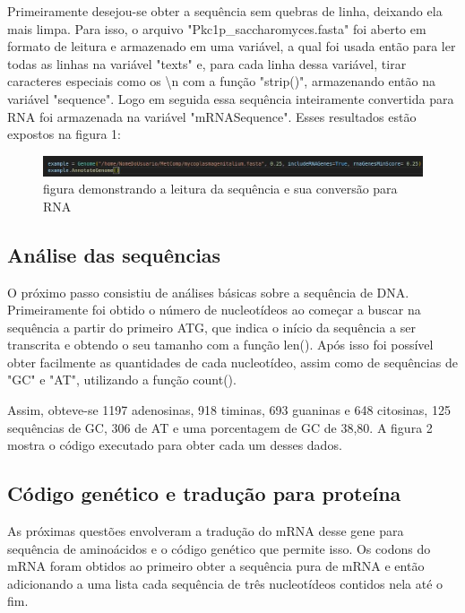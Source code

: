 \documentclass[brazilian,12pt,a4paper,final]{article}
\begin{document}
	
	
	
	
	
	
	
	
	  
	
	\indent 
	Primeiramente desejou-se obter a sequência sem quebras de linha, deixando ela mais limpa.
	Para isso, o arquivo "Pkc1p\_saccharomyces.fasta" foi aberto em formato de leitura e armazenado
	em uma variável, a qual foi usada então para ler todas as linhas na variável "texts" e, para cada
	linha dessa variável, tirar caracteres especiais como os \textbackslash{}n com a função "strip()", armazenando 
	então na variável "sequence". Logo em seguida essa sequência inteiramente convertida para RNA foi
	armazenada na variável "mRNASequence". Esses resultados estão expostos na figura 1:
	\vspace{0.5cm}
	
	\begin{figure}[hbtp]
		\begin{center}
			\includegraphics[]{Instanciacao.jpg}
			\caption{figura demonstrando a leitura da sequência e sua conversão para RNA}
			\label{fig}
		\end{center}
	\end{figure}
	
	\subsection{Análise das sequências}
	O próximo passo consistiu de análises básicas sobre a sequência de DNA. Primeiramente foi obtido o número de nucleotídeos ao começar a buscar na sequência a partir do primeiro ATG, que indica o início da sequência a ser transcrita e obtendo o seu tamanho com a função
	len(). Após isso foi possível obter facilmente as quantidades de cada nucleotídeo, assim como de sequências de "GC" e "AT", utilizando a função count().
	
	Assim, obteve-se 1197 adenosinas, 918 timinas, 693 guaninas e 648 citosinas, 125 sequências de GC, 306 de AT e uma porcentagem de GC de 38,80. A figura 2 mostra o código executado para obter cada um desses dados.
	
	
	\subsection{Código genético e tradução para proteína}
	As próximas questões envolveram a tradução do mRNA desse gene para sequência de aminoácidos e o código genético que permite isso. Os codons do mRNA foram obtidos ao primeiro obter a sequência pura de mRNA e então adicionando a uma lista cada sequência de três nucleotídeos contidos nela até o fim.
	
\end{document}
